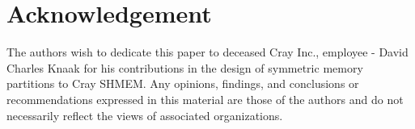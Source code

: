 \section{Acknowledgement}\label{src:ack}
The authors wish to dedicate this paper to deceased Cray Inc., employee -
David Charles Knaak for his contributions in the design of symmetric
memory partitions to Cray SHMEM. Any opinions, findings, and conclusions
or recommendations expressed in this material are those of the authors
and do not necessarily reflect the views of associated organizations.